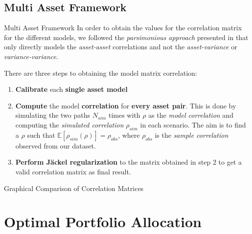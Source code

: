 \documentclass[c, 10pt]{beamer}
\begin{document}
\subsection{Multi Asset Framework}
\begin{frame}{Multi Asset Framework}
In order to obtain the values for the correlation matrix for the different models, we followed the \textit{parsimonious approach} presented in \citep{PARSIMONIOUS2011}
that only directly models the \textit{asset-asset} correlations and not the \textit{asset-variance} or \textit{variance-variance}.

There are three steps to obtaining the model matrix correlation:
\begin{enumerate}
	\item \textbf{Calibrate} each \textbf{single asset model}
	\item \textbf{Compute} the model \textbf{correlation} for \textbf{every asset pair}. This is done by simulating the two paths $N_{sim}$ times with $\rho$ as the \textit{model correlation} and computing the \textit{simulated correlation} $\rho_{sim}$ in each scenario. The aim is to find a $\rho$ such that 
	$ \mathbb{E} [\rho_{sim}(\rho)] = \rho_{obs}$, where  $\rho_{obs}$ is the \textit{sample correlation} observed from our dataset.
	
	\item \textbf{Perform J\"ackel regularization} to the matrix obtained in step 2 to get a valid correlation matrix as final result.
\end{enumerate}
\end{frame}

\begin{frame}{Graphical Comparison of Correlation Matrices}


\end{frame}


\section{Optimal Portfolio Allocation}
\end{document}

